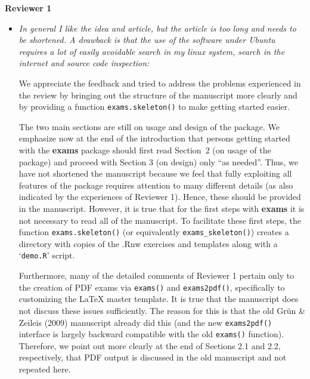 \documentclass[a4paper]{article}
\begin{document}



\textbf{\Large Reviewer 1}

\medskip

\begin{itemize}

\item {\it
In general I like the idea and article, but the article is too long and
needs to be shortened. A drawback is that the use of the software under
Ubuntu requires a lot of easily avoidable search in my linux system, search
in the internet and source code inspection:}

We appreciate the feedback and tried to address the problems experienced
in the review by bringing out the structure of the manuscript more clearly
and by providing a function \texttt{exams.skeleton()} to make getting started
easier.

The two main sections are still on usage and design of the package. We
emphasize now at the end of the introduction that persons getting started
with the \textbf{exams} package should first read Section~2 (on usage of the package)
and proceed with Section 3 (on design) only ``as needed''. Thus, we have not
shortened the manuscript because we feel that fully exploiting all features
of the package requires attention to many different details (as also indicated
by the experiences of Reviewer 1). Hence, these should be provided in the
manuscript. However, it is true that for the first steps with \textbf{exams} it
is not necessary to read all of the manuscript. To facilitate these first
steps, the function \texttt{exams.skeleton()} (or equivalently \verb|exams_skeleton()|)
creates a directory with copies of the .Rnw exercises and templates along
with a `\texttt{demo.R}' script.

Furthermore, many of the detailed comments of Reviewer 1 pertain only to
the creation of PDF exams via \texttt{exams()} and \texttt{exams2pdf()}, specifically to
customizing the {\LaTeX} master template. It is true that the manuscript does
not discuss these issues sufficiently. The reason for this is that the old
Gr\"un \& Zeileis (2009) manuscript already did this (and the new \texttt{exams2pdf()}
interface is largely backward compatible with the old \texttt{exams()} function).
Therefore, we point out more clearly at the end of Sections 2.1 and 2.2,
respectively, that PDF output is discussed in the old manuscript and not
repeated here.


\end{itemize}
\end{document}
